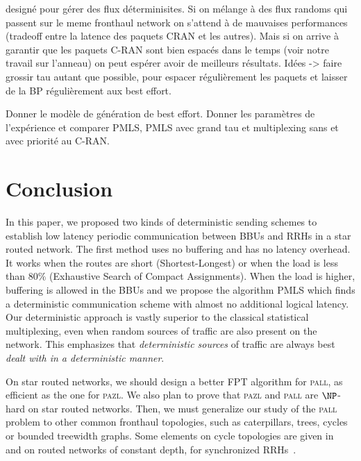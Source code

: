\documentclass[a4paper,10pt]{article}
\newcommand\pazl{\textsc{pazl}\xspace}
\newcommand\pall{\textsc{pall}\xspace}
\begin{document}
    designé pour gérer des flux déterminisites. Si on mélange à des flux randoms qui passent sur le meme
    fronthaul network  on s'attend à de mauvaises performances (tradeoff entre la latence des paquets CRAN 
    et les autres). Mais si on arrive à garantir que les paquets C-RAN sont bien espacés dans le temps (voir notre travail sur l'anneau) on peut espérer avoir de meilleurs résultats.
    Idées -> faire grossir tau autant que possible, pour espacer régulièrement les paquets et 
    laisser de la BP régulièrement aux best effort. 

    Donner le modèle de génération de best effort.
    Donner les paramètres de l'expérience et comparer PMLS, PMLS avec grand tau et multiplexing
    sans et avec priorité au C-RAN.



 \section{Conclusion}

	In this paper, we proposed two kinds of deterministic sending schemes to establish low latency periodic communication between BBUs and RRHs in a star routed network. The first method uses no buffering and has no latency overhead. It works when the routes are short (Shortest-Longest) or when the load is less than $80\%$ (Exhaustive Search of Compact Assignments).  
	When the load is higher, buffering is allowed in the BBUs and we propose the algorithm PMLS which finds a deterministic communication scheme with almost no additional logical latency.
 	Our deterministic approach is vastly superior to the classical statistical multiplexing, even when random sources of traffic are also present on the network. This emphasizes that \emph{deterministic sources} of traffic are always best \emph{dealt with in a deterministic manner}.  
   
  	On star routed networks, we should design a better FPT algorithm for \pall, as efficient as the one for \pazl. We also plan to prove that \pazl and \pall are $\NP$-hard on star routed networks.
   	Then, we must generalize our study of the \pall problem to other common fronthaul topologies,
   	such as caterpillars, trees, cycles or bounded treewidth graphs. Some elements on cycle topologies
   	are given in~\cite{DBLP:conf/ondm/BarthGS19} and on routed networks of constant depth, for synchronized
   	RRHs~\cite{guiraud2020synchronized}.
\end{document}
